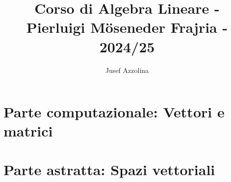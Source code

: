 \documentclass[a4paper]{extbook}
\title{Corso di Algebra Lineare - Pierluigi Möseneder Frajria - 2024/25}
\author{Jusef Azzolina}
\date{}
\begin{document}
\tikzset{external/export=false, external/optimize=false}
\maketitle



\tableofcontents

\part{Parte computazionale: Vettori e matrici}











\part{Parte astratta: Spazi vettoriali}


\end{document}
